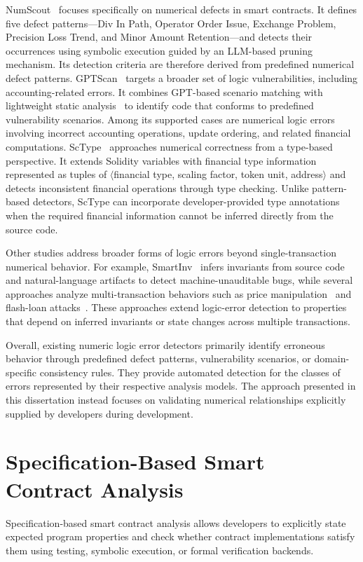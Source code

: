 \documentclass[11pt,oneside]{report}
\theoremstyle{plain}
\theoremstyle{definition}
\theoremstyle{remark}
\begin{document}
NumScout~\citep{numscout} focuses specifically on numerical defects in smart contracts.
It defines five defect patterns---Div In Path, Operator Order Issue, Exchange Problem, Precision Loss Trend, and Minor Amount Retention---and detects their occurrences using symbolic execution guided by an LLM-based pruning mechanism.
Its detection criteria are therefore derived from predefined numerical defect patterns.
GPTScan~\citep{gptscan} targets a broader set of logic vulnerabilities, including accounting-related errors.
It combines GPT-based scenario matching with lightweight static analysis~\citep{slither} to identify code that conforms to predefined vulnerability scenarios.
Among its supported cases are numerical logic errors involving incorrect accounting operations, update ordering, and related financial computations.
ScType~\citep{sctype} approaches numerical correctness from a type-based perspective.
It extends Solidity variables with financial type information represented as tuples of $\langle$financial type, scaling factor, token unit, address$\rangle$ and detects inconsistent financial operations through type checking.
Unlike pattern-based detectors, ScType can incorporate developer-provided type annotations when the required financial information cannot be inferred directly from the source code.

Other studies address broader forms of logic errors beyond single-transaction numerical behavior.
For example, SmartInv~\citep{smartinv} infers invariants from source code and natural-language artifacts to detect machine-unauditable bugs, while several approaches analyze multi-transaction behaviors such as price manipulation~\citep{defiranger,defiguard,pomabuster,secplf,defitainter} and flash-loan attacks~\citep{defitail,midnight}.
These approaches extend logic-error detection to properties that depend on inferred invariants or state changes across multiple transactions.

Overall, existing numeric logic error detectors primarily identify erroneous behavior through predefined defect patterns, vulnerability scenarios, or domain-specific consistency rules.
They provide automated detection for the classes of errors represented by their respective analysis models.
The approach presented in this dissertation instead focuses on validating numerical relationships explicitly supplied by developers during development.

\section{Specification-Based Smart Contract Analysis}
\label{sec:rel:intent}
Specification-based smart contract analysis allows developers to explicitly state expected program properties and check whether contract implementations satisfy them using testing, symbolic execution, or formal verification backends.
\end{document}
